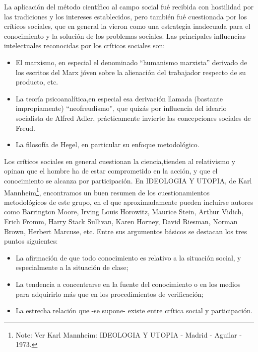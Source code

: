 \documentclass[
]{book}
\providecommand{\tightlist}{%
  \setlength{\itemsep}{0pt}\setlength{\parskip}{0pt}}
\begin{document}
La aplicación del método científico al campo social fué recibida con hostilidad por las tradiciones y los intereses establecidos, pero también fué cuestionada por los críticos sociales, que en general la vieron como una estrategia inadecuada para el conocimiento y la solución de los problemas sociales. Las principales influencias intelectuales reconocidas por los críticos sociales son:

\begin{itemize}
\tightlist
\item
  El marxismo, en especial el denominado ``humanismo marxista'' derivado de los escritos del Marx jóven sobre la alienación del trabajador respecto de su producto, etc.
\item
  La teoría psicoanalítica,en especial esa derivación llamada (bastante impropiamente) ``neofreudismo'', que quizás por influencia del ideario socialista de Alfred Adler, prácticamente invierte las concepciones sociales de Freud.
\item
  La filosofía de Hegel, en particular su enfoque metodológico.
\end{itemize}

Los críticos sociales en general cuestionan la ciencia,tienden al relativismo y opinan que el hombre ha de estar comprometido en la acción, y que el conocimiento se alcanza por participación. En IDEOLOGIA Y UTOPIA, de Karl Mannheim\footnote{Note: Ver Karl Mannheim: IDEOLOGIA Y UTOPIA - Madrid - Aguilar - 1973.}, encontramos un buen resumen de los cuestionamientos metodológicos de este grupo, en el que aproximadamente pueden incluírse autores como Barrington Moore, Irving Louis Horowitz, Maurice Stein, Arthur Vidich, Erich Fromm, Harry Stack Sullivan, Karen Horney, David Riesman, Norman Brown, Herbert Marcuse, etc. Entre sus argumentos básicos se destacan los tres puntos siguientes:

\begin{itemize}
\tightlist
\item
  La afirmación de que todo conocimiento es relativo a la situación social, y especialmente a la situación de clase;
\item
  La tendencia a concentrarse en la fuente del conocimiento o en los medios para adquirirlo más que en los procedimientos de verificación;
\item
  La estrecha relación que -se supone- existe entre crítica social y participación.
\end{itemize}
\end{document}
